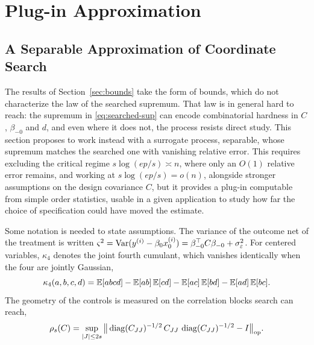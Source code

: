 \section{Plug-in Approximation}
\label{sec:plugin}


\subsection{A Separable Approximation of Coordinate Search}
\label{sec:plugin-regression}

The results of Section~\ref{sec:bounds} take the form of bounds,
which do not characterize the law of the searched supremum. That law is
in general hard to reach: the supremum in \eqref{eq:searched-sup} can
encode combinatorial hardness in $C$, $\beta_{-0}$ and $d$, and even
where it does not, the process resists direct study. This section
proposes to work instead with a surrogate process, separable, whose
supremum matches the searched one with vanishing relative error. This
requires excluding the critical regime $s\log(ep/s) \asymp n$, where only
an $O(1)$ relative error remains, and working at $s\log(ep/s) = o(n)$,
alongside stronger assumptions on the design covariance $C$, but it
provides a plug-in computable from simple order statistics, usable in a
given application to study how far the choice of specification could have
moved the estimate.

Some notation is needed to state assumptions. The variance of the outcome
net of the treatment is written
$\varsigma^2 = \operatorname{Var}(y^{(i)} - \beta_0 x_0^{(i)})
= \beta_{-0}^\top C \beta_{-0} + \sigma_\varepsilon^2$. For centered
variables, $\kappa_4$ denotes the joint fourth cumulant, which vanishes
identically when the four are jointly Gaussian,
\begin{equation*}
        \kappa_4(a, b, c, d) = \mathbb{E}[abcd]
        - \mathbb{E}[ab]\,\mathbb{E}[cd] - \mathbb{E}[ac]\,\mathbb{E}[bd] - \mathbb{E}[ad]\,\mathbb{E}[bc].
\end{equation*}
The geometry of the controls is measured on the correlation blocks search
can reach,
\begin{equation}\label{eq:local-isotropy}
        \rho_s(C) = \sup_{|J| \le 2s}
        \big\| \operatorname{diag}(C_{JJ})^{-1/2}\, C_{JJ}\, \operatorname{diag}(C_{JJ})^{-1/2}
        - I \big\|_{\mathrm{op}} .
\end{equation}

